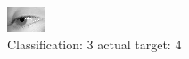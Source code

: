 \begin{figure}[h!]
\begin{center}
\includegraphics[width=0.60\columnwidth]{figures/ID3013_class_3_target_4.png}
\end{center}
\caption{ Classification: 3 actual target: 4}
\label{fig:ID3013_class_3_target_4}
\end{figure}
